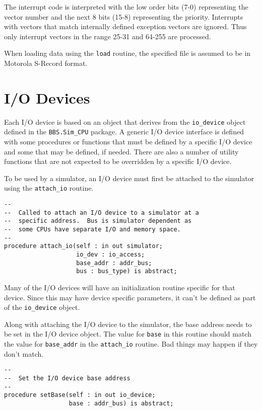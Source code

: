 \documentclass[10pt, openany]{book}
\begin{document}
The interrupt code is interpreted with the low order bits (7-0) representing the vector number and the next 8 bits (15-8) representing the priority.  Interrupts with vectors that match internally defined exception vectors are ignored.  Thus only interrupt vectors in the range 25-31 and 64-255 are processed.

When loading data using the \verb|load| routine, the specified file is assumed to be in Motorola S-Record format.

\chapter{I/O Devices}
\label{chap:IODev}
Each I/O device is based on an object that derives from the \verb|io_device| object defined in the \verb|BBS.Sim_CPU| package.  A generic I/O device interface is defined with some procedures or functions that must be defined by a specific I/O device and some that may be defined, if needed.  There are also a number of utility functions that are not expected to be overridden by a specific I/O device.

To be used by a simulator, an I/O device must first be attached to the simulator using the \verb|attach_io| routine.
\begin{lstlisting}
--
--  Called to attach an I/O device to a simulator at a
--  specific address.  Bus is simulator dependent as
--  some CPUs have separate I/O and memory space.
--
procedure attach_io(self : in out simulator;
                    io_dev : io_access;
                    base_addr : addr_bus;
                    bus : bus_type) is abstract;
\end{lstlisting}

Many of the I/O devices will have an initialization routine specific for that device.  Since this may have device specific parameters, it can't be defined as part of the \verb|io_device| object.

Along with attaching the I/O device to the simulator, the base address needs to be set in the I/O device object.  The value for \verb|base| in this routine should match the value for \verb|base_addr| in the \verb|attach_io| routine.  Bad things may happen if they don't match.
\begin{lstlisting}
--
--  Set the I/O device base address
--
procedure setBase(self : in out io_device;
                  base : addr_bus) is abstract;
\end{lstlisting}
\end{document}
